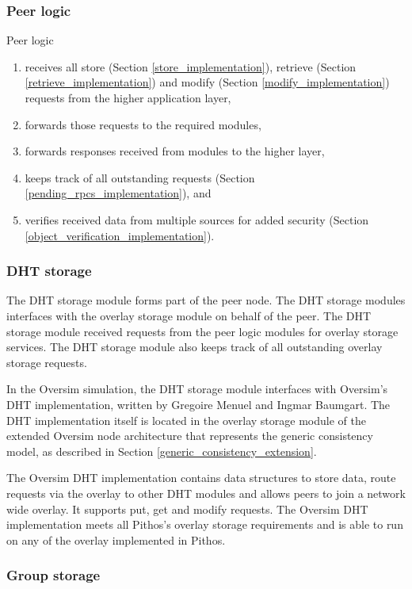\subsubsection{Peer logic}

Peer logic
\begin{enumerate}
  \item  receives all store (Section \ref{store_implementation}), retrieve (Section \ref{retrieve_implementation}) and modify (Section \ref{modify_implementation}) requests from the higher application layer,
  \item forwards those requests to the required modules,
  \item forwards responses received from modules to the higher layer,
  \item keeps track of all outstanding requests (Section \ref{pending_rpcs_implementation}), and
  \item verifies received data from multiple sources for added security (Section \ref{object_verification_implementation}).
\end{enumerate}

\subsubsection{DHT storage}

The DHT storage module forms part of the peer node. The DHT storage modules interfaces with the overlay storage module on behalf of the peer. The DHT storage module received requests from the peer logic modules for overlay storage services. The DHT storage module also keeps track of all outstanding overlay storage requests.

In the Oversim simulation, the DHT storage module interfaces with Oversim's DHT implementation, written by Gregoire Menuel and Ingmar Baumgart. The DHT implementation itself is located in the overlay storage module of the extended Oversim node architecture that represents the generic consistency model, as described in Section \ref{generic_consistency_extension}.

The Oversim DHT implementation contains data structures to store data, route requests via the overlay to other DHT modules and allows peers to join a network wide overlay. It supports put, get and modify requests. The Oversim DHT implementation meets all Pithos's overlay storage requirements and is able to run on any of the overlay implemented in Pithos.

\subsubsection{Group storage}

